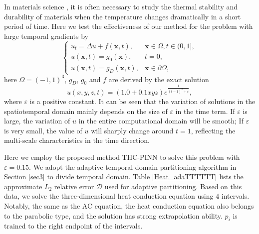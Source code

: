 \documentclass[preprint]{elsarticle}
\numberwithin{table}{section}
\numberwithin{equation}{section}
\numberwithin{figure}{section}
\begin{document}
\begin{CJK}{UTF8}{gbsn}
In materials science \cite{Vikhrenko_2011}, it is often necessary to study the thermal stability and durability of materials when the temperature changes dramatically in a short period of time.   Here we test the effectiveness of our method for the problem with large temporal gradients  by
\begin{equation*}\label{heat_equation}
\begin{cases}
u_t = \Delta u+f(\bm x,t), & \bm x \in \Omega, t \in (0,1], \\
u(\bm x, t)=g_0(\bm x), & t=0,\\
u(\bm x,t) =g_D(\bm x ,t), & \bm x\in\partial\Omega,
\end{cases}
\end{equation*}
here $\Omega=(-1,1)^3$, $g_D$, $g_0$ and $f$ are derived by the 
 exact solution 
\begin{equation*}
u(x,y,z,t) = (1.0 + 0.1  x   y   z)  e^{\frac{1}{(t-1)^2+\varepsilon}},
\end{equation*}
where $\varepsilon$ is a positive constant.
It can be seen that the variation of solutions in the spatiotemporal domain mainly depends on the size of $\varepsilon$ in the time term. If $\varepsilon$ is large, the variation of $u$ in the entire computational domain will be smooth; If $\varepsilon$ is very small, the value of $u$ will sharply change around $t=1$, reflecting the multi-scale characteristics in the time direction.




 Here we employ the proposed method THC-PINN 
 to solve this problem with $\varepsilon = 0.15$.  
 We adopt the adaptive temporal domain partitioning algorithm  in Section \ref{sec3} to   divide  temporal domain. Table \ref{Heat_adaTTTTTT} lists the approximate $L_2$ relative error $\mathcal{D}$ used for adaptive partitioning. Based on this data, we solve the three-dimensional heat conduction equation using $4$ intervals.   Notably,  the same as the AC equation,  the heat conduction equation also belongs to the parabolic type, and the solution has strong extrapolation ability.  $p_i$ is trained to the right endpoint of the intervals.


\end{CJK}
\end{document}
